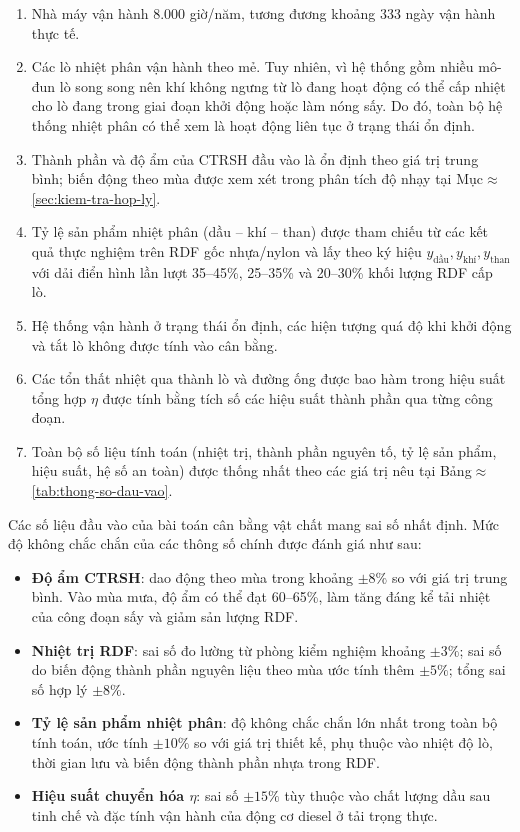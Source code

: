 \documentclass[../main.tex]{subfiles}
\begin{document}
\begin{enumerate}
  \item Nhà máy vận hành 8.000 giờ/năm, tương đương khoảng 333 ngày vận hành thực tế.
  \item Các lò nhiệt phân vận hành theo mẻ. Tuy nhiên, vì hệ thống gồm nhiều mô-đun lò song song nên khí không ngưng từ lò đang hoạt động có thể cấp nhiệt cho lò đang trong giai đoạn khởi động hoặc làm nóng sấy. Do đó, toàn bộ hệ thống nhiệt phân có thể xem là hoạt động liên tục ở trạng thái ổn định.
  \item Thành phần và độ ẩm của CTRSH đầu vào là ổn định theo giá trị trung bình; biến động theo mùa được xem xét trong phân tích độ nhạy tại Mục$\approx$\ref{sec:kiem-tra-hop-ly}.
  \item Tỷ lệ sản phẩm nhiệt phân (dầu -- khí -- than) được tham chiếu từ các kết quả thực nghiệm trên RDF gốc nhựa/nylon \cite{Sharuddin2016,Miandad2016} và lấy theo ký hiệu $y_{\text{dầu}}, y_{\text{khí}}, y_{\text{than}}$ với dải điển hình lần lượt 35--45\%, 25--35\% và 20--30\% khối lượng RDF cấp lò.
  \item Hệ thống vận hành ở trạng thái ổn định, các hiện tượng quá độ khi khởi động và tắt lò không được tính vào cân bằng.
  \item Các tổn thất nhiệt qua thành lò và đường ống được bao hàm trong hiệu suất tổng hợp $\eta$ được tính bằng tích số các hiệu suất thành phần qua từng công đoạn.
  \item Toàn bộ số liệu tính toán (nhiệt trị, thành phần nguyên tố, tỷ lệ sản phẩm, hiệu suất, hệ số an toàn) được thống nhất theo các giá trị nêu tại Bảng$\approx$\ref{tab:thong-so-dau-vao}.
\end{enumerate}

Các số liệu đầu vào của bài toán cân bằng vật chất mang sai số nhất định. Mức độ không chắc chắn của các thông số chính được đánh giá như sau:

\begin{itemize}
  \item \textbf{Độ ẩm CTRSH}: dao động theo mùa trong khoảng $\pm 8\%$ so với giá trị trung bình. Vào mùa mưa, độ ẩm có thể đạt 60--65\%, làm tăng đáng kể tải nhiệt của công đoạn sấy và giảm sản lượng RDF.
  \item \textbf{Nhiệt trị RDF}: sai số đo lường từ phòng kiểm nghiệm khoảng $\pm 3\%$; sai số do biến động thành phần nguyên liệu theo mùa ước tính thêm $\pm 5\%$; tổng sai số hợp lý $\pm 8\%$.
  \item \textbf{Tỷ lệ sản phẩm nhiệt phân}: độ không chắc chắn lớn nhất trong toàn bộ tính toán, ước tính $\pm 10\%$ so với giá trị thiết kế, phụ thuộc vào nhiệt độ lò, thời gian lưu và biến động thành phần nhựa trong RDF.
  \item \textbf{Hiệu suất chuyển hóa $\eta$}: sai số $\pm 15\%$ tùy thuộc vào chất lượng dầu sau tinh chế và đặc tính vận hành của động cơ diesel ở tải trọng thực.
\end{itemize}
\end{document}
